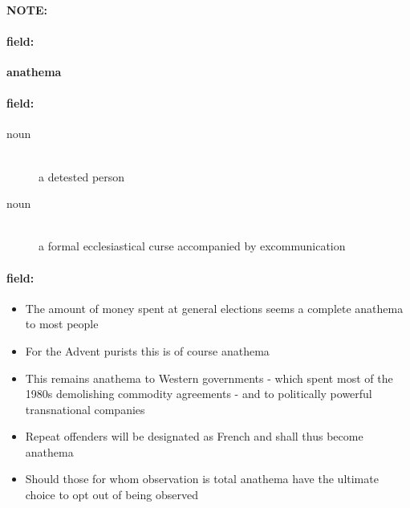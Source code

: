 \documentclass[12pt]{article}
\newenvironment{note}{\paragraph{NOTE:}}{}
\newenvironment{field}{\paragraph{field:}}{}
\begin{document}
\begin{note}
\begin{field}
\textbf{\large anathema}
\end{field}


\begin{field}
\begin{description}
\item[noun] \hfill \\ 
a detested person

\item[noun] \hfill \\ 
a formal ecclesiastical curse accompanied by excommunication

\end{description}
\end{field}

\begin{field}
\begin{itemize}
\item The amount of money spent at general elections seems a complete anathema to most people
\item For the Advent purists this is of course anathema
\item This remains anathema to Western governments - which spent most of the 1980s demolishing commodity agreements - and to politically powerful transnational companies
\item Repeat offenders will be designated as French and shall thus become anathema
\item Should those for whom observation is total anathema have the ultimate choice to opt out of being observed
\end{itemize}
\end{field}
\end{note}
\end{document}
